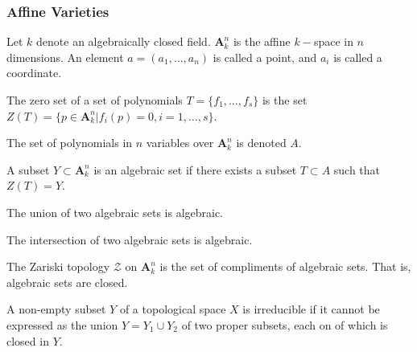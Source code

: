\documentclass[crop=false,class=book,oneside]{standalone}
\begin{document}
            \subsubsection{Affine Varieties}
                Let $k$ denote an algebraically closed field.
                $\textbf{A}_{k}^n$ is the affine $k-$space in
                $n$ dimensions. An element $a=(a_1,\hdots, a_n)$
                is called a point, and $a_i$ is called a coordinate.
                \begin{definition}
                    The zero set of a set of polynomials
                    $T=\{f_{1},\hdots,f_{s}\}$ is the set
                    $Z(T)%
                     =\{p\in\textbf{A}_{k}^{n}|f_{i}(p)=0,%
                        i=1,\hdots,s\}$.
                \end{definition}
                \begin{notation}
                    The set of polynomials in $n$ variables
                    over $\textbf{A}_{k}^{n}$ is denoted $A$.
                \end{notation}
                \begin{definition}
                    A subset $Y\subset\textbf{A}_{k}^{n}$ is an
                    algebraic set if there exists a subset
                    $T\subset{A}$ such that $Z(T)=Y$.
                \end{definition}
                \begin{theorem}
                    The union of two algebraic
                    sets is algebraic.
                \end{theorem}
                \begin{theorem}
                    The intersection of two algebraic
                    sets is algebraic.
                \end{theorem}
                \begin{definition}
                    The Zariski topology $\mathcal{Z}$ on
                    $\textbf{A}_{k}^{n}$ is the set of compliments
                    of algebraic sets. That is,
                    algebraic sets are closed.
                \end{definition}
                \begin{definition}
                    A non-empty subset $Y$ of a topological space
                    $X$ is irreducible if it cannot be expressed
                    as the union $Y={Y_{1}}\cup{Y_{2}}$ of
                    two proper subsets, each on of which is
                    closed in $Y$.
                \end{definition}
\end{document}
